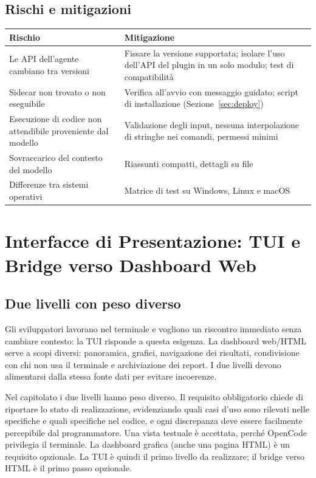 \documentclass[a4paper, 11pt]{article}
\begin{document}
\subsection{Rischi e mitigazioni}

\vspace{0.3cm}
\noindent
\begin{tabularx}{\textwidth}{|X|X|}
    \hline
    \textbf{Rischio} & \textbf{Mitigazione} \\ \hline
    Le API dell'agente cambiano tra versioni & Fissare la versione supportata; isolare l'uso dell'API del plugin in un solo modulo; test di compatibilità \\ \hline
    Sidecar non trovato o non eseguibile & Verifica all'avvio con messaggio guidato; script di installazione (Sezione~\ref{sec:deploy}) \\ \hline
    Esecuzione di codice non attendibile proveniente dal modello & Validazione degli input, nessuna interpolazione di stringhe nei comandi, permessi minimi \\ \hline
    Sovraccarico del contesto del modello & Riassunti compatti, dettagli su file \\ \hline
    Differenze tra sistemi operativi & Matrice di test su Windows, Linux e macOS \\ \hline
\end{tabularx}
\vspace{0.3cm}


\section{Interfacce di Presentazione: TUI e Bridge verso Dashboard Web}
\label{sec:presentazione}

\subsection{Due livelli con peso diverso}
Gli sviluppatori lavorano nel terminale e vogliono un riscontro immediato senza cambiare contesto: la TUI risponde a questa esigenza. La dashboard web/HTML serve a scopi diversi: panoramica, grafici, navigazione dei risultati, condivisione con chi non usa il terminale e archiviazione dei report. I due livelli devono alimentarsi dalla stessa fonte dati per evitare incoerenze.

Nel capitolato i due livelli hanno peso diverso. Il requisito obbligatorio chiede di riportare lo stato di realizzazione, evidenziando quali casi d'uso sono rilevati nelle specifiche e quali specifiche nel codice, e ogni discrepanza deve essere facilmente percepibile dal programmatore. Una vista testuale è accettata, perché OpenCode privilegia il terminale. La dashboard grafica (anche una pagina HTML) è un requisito opzionale. La TUI è quindi il primo livello da realizzare; il bridge verso HTML è il primo passo opzionale.
\end{document}
